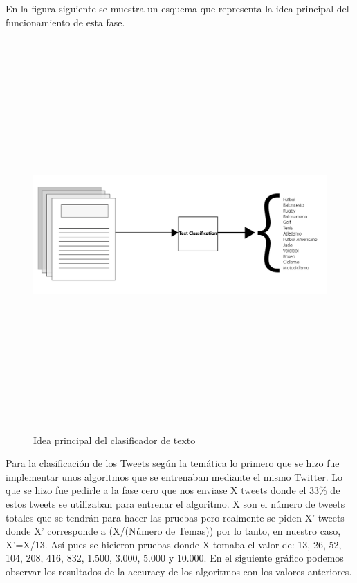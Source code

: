\documentclass[../all.tex]{subfiles}
\begin{document}
	En la figura siguiente se muestra un esquema que representa la idea principal del funcionamiento de esta fase.\\
	
	\begin{figure}[H]
	    \centering
	    \includegraphics[height=15cm, width=15cm]{imgs/textClassification.png}
	    \caption{Idea principal del clasificador de texto}
	\end{figure}


	Para la clasificación de los Tweets según la temática lo primero que se hizo fue implementar unos algoritmos que se entrenaban mediante el mismo Twitter. Lo que se hizo fue pedirle a la fase cero que nos enviase X tweets donde el 33\% de estos tweets se utilizaban para entrenar el algoritmo. X son el número de tweets totales que se tendrán para hacer las pruebas pero realmente se piden X’ tweets donde X’ corresponde a (X/(Número de Temas)) por lo tanto, en nuestro caso, X’=X/13. Así pues se hicieron pruebas donde X tomaba el valor de: 13, 26, 52, 104, 208, 416, 832, 1.500, 3.000, 5.000 y 10.000.  En el siguiente gráfico podemos observar los resultados de la accuracy de los algoritmos con los valores anteriores.\\
	
\end{document}
